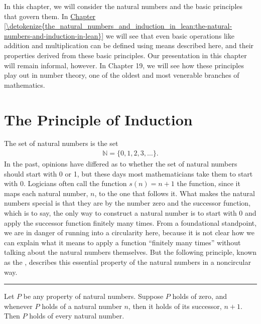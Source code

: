 \documentclass[letterpaper,10pt,english]{sphinxmanual}
\begin{document}
\sphinxAtStartPar
In this chapter, we will consider the natural numbers and the basic principles that govern them. In \hyperref[\detokenize{the_natural_numbers_and_induction_in_lean:the-natural-numbers-and-induction-in-lean}]{Chapter \ref{\detokenize{the_natural_numbers_and_induction_in_lean:the-natural-numbers-and-induction-in-lean}}} we will see that even basic operations like addition and multiplication can be defined using means described here, and their properties derived from these basic principles. Our presentation in this chapter will remain informal, however. In Chapter 19, we will see how these principles play out in number theory, one of the oldest and most venerable branches of mathematics.


\section{The Principle of Induction}
\label{\detokenize{the_natural_numbers_and_induction:the-principle-of-induction}}
\sphinxAtStartPar
The set of natural numbers is the set
\begin{equation*}
\begin{split}\mathbb{N} = \{ 0, 1, 2, 3, \ldots \}.\end{split}
\end{equation*}
\sphinxAtStartPar
In the past, opinions have differed as to whether the set of natural numbers should start with 0 or 1, but these days most mathematicians take them to start with 0. Logicians often call the function \(s(n) = n + 1\) the  function, since it maps each natural number, \(n\), to the one that follows it. What makes the natural numbers special is that they are  by the number zero and the successor function, which is to say, the only way to construct a natural number is to start with \(0\) and apply the successor function finitely many times. From a foundational standpoint, we are in danger of running into a circularity here, because it is not clear how we can explain what it means to apply a function “finitely many times” without talking about the natural numbers themselves. But the following principle, known as the , describes this essential property of the natural numbers in a non\sphinxhyphen{}circular way.


\bigskip\hrule\bigskip


\sphinxAtStartPar
{} Let \(P\) be any property of natural numbers. Suppose \(P\) holds of zero, and whenever \(P\) holds of a natural number \(n\), then it holds of its successor, \(n + 1\). Then \(P\) holds of every natural number.
\end{document}
